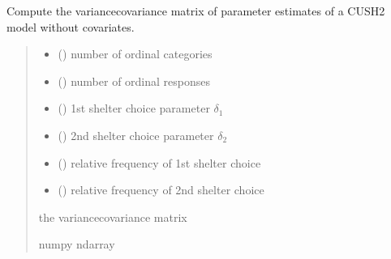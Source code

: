 \documentclass[letterpaper,10pt,english]{sphinxmanual}
\begin{document}

\begin{fulllineitems}
\label{\detokenize{cubmods:cubmods.cush2.varcov}}
\pysigstartsignatures
{}
\pysigstopsignatures
\sphinxAtStartPar
Compute the variance\sphinxhyphen{}covariance matrix of parameter 
estimates of a CUSH2 model without covariates.
\begin{quote}\begin{description}
\begin{itemize}
\item {} 
\sphinxAtStartPar
{} () \textendash{} number of ordinal categories

\item {} 
\sphinxAtStartPar
{} () \textendash{} number of ordinal responses

\item {} 
\sphinxAtStartPar
{} () \textendash{} 1st shelter choice parameter \(\delta_1\)

\item {} 
\sphinxAtStartPar
{} () \textendash{} 2nd shelter choice parameter \(\delta_2\)

\item {} 
\sphinxAtStartPar
{} () \textendash{} relative frequency of 1st shelter choice

\item {} 
\sphinxAtStartPar
{} () \textendash{} relative frequency of 2nd shelter choice

\end{itemize}

\sphinxAtStartPar
the variance\sphinxhyphen{}covariance matrix

\sphinxAtStartPar
numpy ndarray

\end{description}\end{quote}

\end{fulllineitems}
\end{document}
